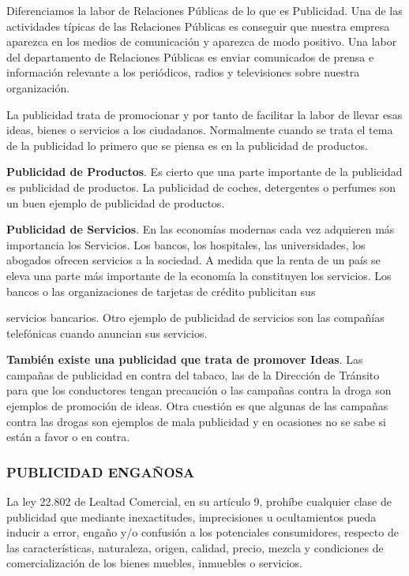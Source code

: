 Diferenciamos la labor de Relaciones Públicas de lo que es Publicidad. Una de las actividades típicas de las Relaciones Públicas es conseguir que nuestra empresa aparezca en los medios de comunicación y aparezca de modo positivo. Una labor del departamento de Relaciones Públicas es enviar comunicados de prensa e información relevante a los periódicos, radios y televisiones sobre nuestra organización.

La publicidad trata de promocionar y por tanto de facilitar la labor de llevar esas ideas, bienes o servicios a los ciudadanos. Normalmente cuando se trata el tema de la publicidad lo primero que se piensa es en la publicidad de productos.

\textbf{Publicidad de Productos}. Es cierto que una parte importante de la publicidad es publicidad de productos. La publicidad de coches, detergentes o perfumes son un buen ejemplo de publicidad de productos.

\textbf{Publicidad de Servicios}. En las economías modernas cada vez adquieren más importancia los Servicios. Los bancos, los hospitales, las universidades, los abogados ofrecen servicios a la sociedad. A medida que la renta de un país se eleva una parte más importante de la economía la constituyen los servicios. Los bancos o las organizaciones de tarjetas de crédito publicitan sus



servicios bancarios. Otro ejemplo de publicidad de servicios son las compañías telefónicas cuando anuncian sus servicios.

\textbf{También existe una publicidad que trata de promover Ideas}. Las campañas de publicidad en contra del tabaco, las de la Dirección de Tránsito para que los conductores tengan precaución o las campañas contra la droga son ejemplos de promoción de ideas. Otra cuestión es que algunas de las campañas contra las drogas son ejemplos de mala publicidad y en ocasiones no se sabe si están a favor o en contra.

\subsubsection*{PUBLICIDAD ENGAÑOSA}
La ley 22.802 de Lealtad Comercial, en su artículo 9, prohíbe cualquier clase de publicidad que mediante inexactitudes, imprecisiones u ocultamientos pueda inducir a error, engaño y/o confusión a los potenciales consumidores, respecto de las características, naturaleza, origen, calidad, precio, mezcla y condiciones de comercialización de los bienes muebles, inmuebles o servicios.

